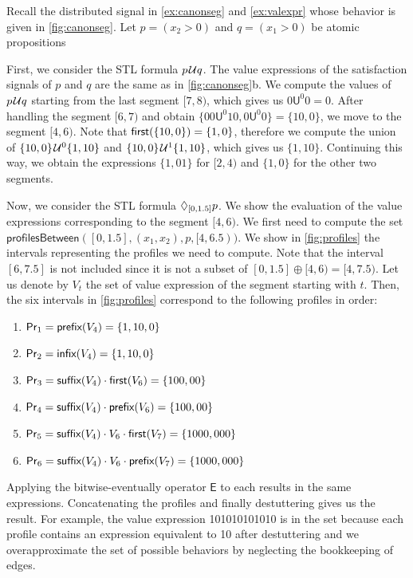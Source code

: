 \begin{example}
	Recall the distributed signal  in \cref{ex:canonseg} and \cref{ex:valexpr} whose behavior is given in \cref{fig:canonseg}.
	Let $p = (x_2 > 0)$ and $q = (x_1 > 0)$ be atomic propositions
	
	First, we consider the STL formula $p \kern.1em\mathcal{U} q$.
	The value expressions of the satisfaction signals of $p$ and $q$ are the same as in \cref{fig:canonseg}b.
	We compute the values of $p \kern.1em\mathcal{U} q$ starting from the last segment $[7,8)$, which gives us $0 \mathsf{U}^0 0 = 0$.
	After handling the segment $[6,7)$ and obtain $\{ 00 \mathsf{U}^0 10, 0 \mathsf{U}^0 0 \} = \{10, 0\}$, we move to the segment $[4,6)$.
	Note that $\textsf{first}(\{10, 0\}) = \{1,0\}$, therefore we compute the union of $\{10, 0\} \kern.1em\mathcal{U}^0 \{1, 10\}$ and $\{10, 0\} \kern.1em\mathcal{U}^1 \{1, 10\}$, which gives us $\{1, 10\}$.
	Continuing this way, we obtain the expressions $\{1, 01\}$ for $[2,4)$ and $\{1,0\}$ for the other two segments.
	
	Now, we consider the STL formula $\lozenge_{[0,1.5]} p$.
	We show the evaluation of the value expressions corresponding to the segment $[4,6)$.
	We first need to compute the set $\mathsf{profilesBetween}([0,1.5], (x_1, x_2), p, [4,6.5))$.
	We show in \cref{fig:profiles} the intervals representing the profiles we need to compute.
	Note that the interval $[6, 7.5]$ is not included since it is not a subset of $[0, 1.5] \oplus [4,6) = [4,7.5)$.
	Let us denote by $V_t$ the set of value expression of the segment starting with $t$.
	Then, the six intervals in \cref{fig:profiles} correspond to the following profiles in order:
	\begin{enumerate}
		\item $\mathsf{Pr}_1 = \textsf{prefix}(V_4) = \{1, 10, 0\}$
		\item $\mathsf{Pr}_2 = \textsf{infix}(V_4) = \{1, 10, 0\}$
		\item $\mathsf{Pr}_3 = \textsf{suffix}(V_4) \cdot \textsf{first}(V_6) = \{100, 00\}$
		\item $\mathsf{Pr}_4 = \textsf{suffix}(V_4) \cdot \textsf{prefix}(V_6) = \{100, 00\}$
		\item $\mathsf{Pr}_5 = \textsf{suffix}(V_4) \cdot V_6 \cdot \textsf{first}(V_7) = \{1000, 000\}$
		\item $\mathsf{Pr}_6 = \textsf{suffix}(V_4) \cdot V_6 \cdot \textsf{prefix}(V_7)= \{1000, 000\}$
	\end{enumerate}
	Applying the bitwise-eventually operator $\mathsf{E}$ to each results in the same expressions.
	Concatenating the profiles and finally destuttering gives us the result.	
	For example, the value expression 101010101010 is in the set because each profile contains an expression equivalent to 10 after destuttering and we overapproximate the set of possible behaviors by neglecting the bookkeeping of edges.
\end{example}

